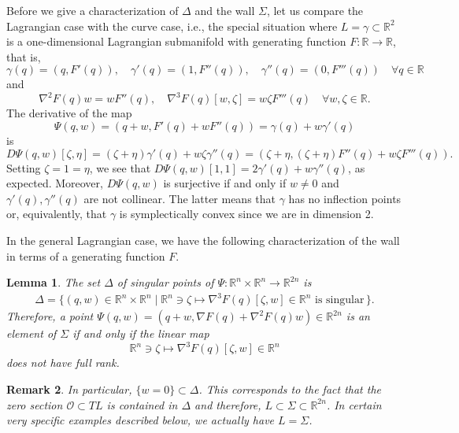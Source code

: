 \documentclass[12pt]{article}
\newtheorem{lemma}{Lemma}[section]
\newtheorem{remark}[lemma]{Remark}
\newcommand{\g}{{\gamma}}
\newcommand{\R}{{\mathbb R}}
\begin{document}
Before we give a characterization of $\Delta$ and the wall $\Sigma$, let us compare the Lagrangian case with the curve case, i.e., the special situation where $L=\gamma\subset\R^2$ is a one-dimensional Lagrangian submanifold with generating function $F:\R\to\R$, that is,
\begin{equation}\nonumber
\g(q)=(q,F'(q)), \quad \g'(q)=(1,F''(q)), \quad\g''(q)=(0,F'''(q))\quad\forall q\in\R
\end{equation}
and
\begin{equation}\nonumber
\nabla^2F(q)w=wF''(q), \quad \nabla^3F(q)[w,\zeta]=w\zeta F'''(q)\quad\forall w,\zeta\in\R.
\end{equation}
The derivative of the map 
$$\Psi(q,w)=(q+w,F'(q)+wF''(q))=\g(q)+w\g'(q)$$
 is
\begin{equation}\nonumber
D\Psi(q,w)[\zeta,\eta]=(\zeta+\eta)\g'(q)+w\zeta\g''(q)=(\zeta+\eta,(\zeta+\eta)F''(q)+w\zeta F'''(q)).
\end{equation}
Setting $\zeta=1=\eta$, we see that $D\Psi(q,w)[1,1]=2\g'(q)+w\g''(q)$, as expected. Moreover, $D\Psi(q,w)$ is surjective if and only if $w\neq0$ and $\g'(q),\g''(q)$ are not collinear. The latter means that $\g$ has no inflection points or, equivalently, that $\g$ is symplectically convex since we are in dimension 2. 

In the general Lagrangian case, we have the following characterization of the wall in terms of a generating function $F$.
\begin{lemma}\label{lem:description_of_wall_Lagrangian_case}
The set $\Delta$ of singular points of $\Psi:\R^n\times\R^n\to \R^{2n}$ is 
\begin{equation}\nonumber
\begin{aligned}
\Delta=\big\{(q,w)\in\R^n\times\R^n\mid\R^n\ni\zeta\mapsto \nabla^3F(q)[\zeta,w]\in\R^n\text{ is singular}\,\big\}.
\end{aligned}
\end{equation}
%
Therefore, a point $\Psi(q,w)=(q+w,\nabla F(q)+\nabla^2F(q)w)\in\R^{2n}$ is an element of $\Sigma$ if and only if the linear map
\begin{equation}\nonumber
\R^n\ni\zeta\mapsto \nabla^3F(q)[\zeta,w]\in\R^n
\end{equation}
does not have full rank. 
\end{lemma}

\begin{remark}
{\rm
In particular, $\{w=0\}\subset\Delta$. This corresponds to the fact that the zero section $\mathcal{O}\subset TL$ is contained in $\Delta$ and therefore, $L\subset\Sigma\subset\R^{2n}$. In certain very specific examples described below, we actually have $L=\Sigma$.
} 
\end{remark}
\end{document}

